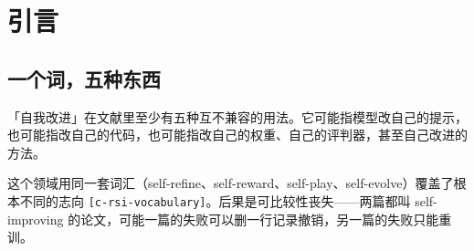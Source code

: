 
\begin{abstract}

「递归自我改进」（RSI）在过去四年从一句愿景变成了一批可运行的系统：模型自己出题、自己解题、自己当裁判、自己改自己的代码，甚至自己改进「改进的方法」。本文对这 61 篇工作做系统梳理，要回答的不是「能不能做到」，而是\textbf{这些闭环究竟在改什么，支撑它们的证据有多强}。


梳理得到一个与直觉不同的判断：真正的变化不在算法，而在\textbf{判断权的位置}。按「改什么」可分五层——上下文、外壳、评判器、权重、改进过程——而层与层之间最关键的区别不是效果大小，是\textbf{单次改动能否被验证、失败能否被回滚}。这两个性质同向变化：越往下，越不可验证、越难回滚。


在这个分层下，四年演进的形状变得清楚：外部锚点沿「人写答案  可判定答案  模型判断  统计量」单向内移。27 篇改权重的工作里，以可判定答案为奖励的 20 篇、以模型判断为奖励的 5 篇、以统计量替代判定的 3 篇。每内移一步都换来更大的可扩展性：从需要人工推理，到只需要一个测试，到只需要一个通过/不通过，最后到只需要一个标量。但每一步也都换来一类新的失效——判断者与被判断者同源，带来自我确认循环与判据饱和；用置信度代替对错，带来与目标的脱钩；改外壳带来验收门的失明，因为门只看得见分数，看不见自己正在拆掉第几层防护。


证据强度的落差比失效模式更值得警惕。对 90 篇自称 RSI 的研究，只有 22\% 审计了两次以上的完整循环。而唯一能回答「能力边界有没有移动」的指标 pass@k，在本文编码的 61 篇里只有 2 篇报告——被最少报告的指标，恰好是最难看的那个。


\textbf{关键词}：递归自我改进；自举；可验证奖励；自我确认循环；模型坍缩；评测审计


\end{abstract}
\section{引言}

\subsection{一个词，五种东西}

「自我改进」在文献里至少有五种互不兼容的用法。它可能指模型改自己的提示，也可能指改自己的代码，也可能指改自己的权重、自己的评判器，甚至自己改进的方法。


这个领域用同一套词汇（self-refine、self-reward、self-play、self-evolve）覆盖了根本不同的志向 {\scriptsize\texttt{[c-\hspace{0pt}rsi-\hspace{0pt}vocabulary]}}。后果是可比较性丧失——两篇都叫 self-improving 的论文，可能一篇的失败可以删一行记录撤销，另一篇的失败只能重训。


